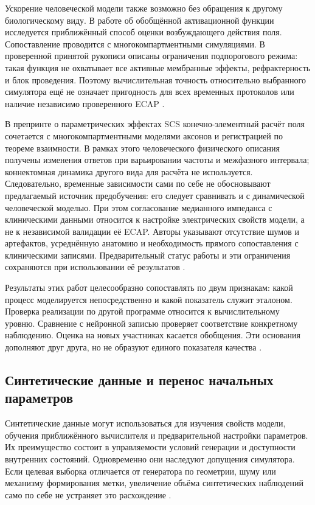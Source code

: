 Ускорение человеческой модели также возможно без обращения к другому биологическому виду. В работе об обобщённой активационной функции исследуется приближённый способ оценки возбуждающего действия поля. Сопоставление проводится с многокомпартментными симуляциями. В проверенной принятой рукописи описаны ограничения подпорогового режима: такая функция не охватывает все активные мембранные эффекты, рефрактерность и блок проведения. Поэтому вычислительная точность относительно выбранного симулятора ещё не означает пригодность для всех временных протоколов или наличие независимо проверенного ECAP \cite{s877}.

В препринте о параметрических эффектах SCS конечно-элементный расчёт поля сочетается с многокомпартментными моделями аксонов и регистрацией по теореме взаимности. В рамках этого человеческого физического описания получены изменения ответов при варьировании частоты и межфазного интервала; коннектомная динамика другого вида для расчёта не используется. Следовательно, временные зависимости сами по себе не обосновывают предлагаемый источник предобучения: его следует сравнивать и с динамической человеческой моделью. При этом согласование медианного импеданса с клиническими данными относится к настройке электрических свойств модели, а не к независимой валидации её ECAP. Авторы указывают отсутствие шумов и артефактов, усреднённую анатомию и необходимость прямого сопоставления с клиническими записями. Предварительный статус работы и эти ограничения сохраняются при использовании её результатов \cite{s876}.

Результаты этих работ целесообразно сопоставлять по двум признакам: какой процесс моделируется непосредственно и какой показатель служит эталоном. Проверка реализации по другой программе относится к вычислительному уровню. Сравнение с нейронной записью проверяет соответствие конкретному наблюдению. Оценка на новых участниках касается обобщения. Эти основания дополняют друг друга, но не образуют единого показателя качества \cite{s285,s743}.

\subsection{Синтетические данные и перенос начальных параметров}

Синтетические данные могут использоваться для изучения свойств модели, обучения приближённого вычислителя и предварительной настройки параметров. Их преимущество состоит в управляемости условий генерации и доступности внутренних состояний. Одновременно они наследуют допущения симулятора. Если целевая выборка отличается от генератора по геометрии, шуму или механизму формирования метки, увеличение объёма синтетических наблюдений само по себе не устраняет это расхождение \cite{s285,s836}.


